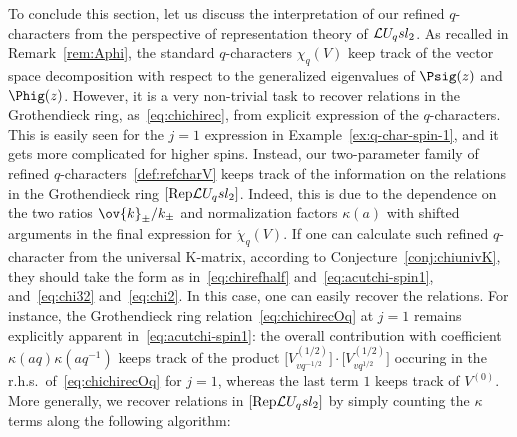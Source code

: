 \documentclass[11pt]{amsart}
\numberwithin{equation}{section}
\numberwithin{equation}{section}
\begin{document}
To conclude this section, let us discuss the interpretation of our refined $q$-characters from the perspective of representation theory of $\mathcal{L} U_q sl_2$.
As recalled in Remark~\ref{rem:Aphi},  the standard $q$-characters $\chi_q(V)$ keep track of the vector space decomposition with respect to the generalized eigenvalues of $\Psig(z)$ and $\Phig(z)$. 
However, it is a very non-trivial task to recover relations in the Grothendieck ring, as~\eqref{eq:chichirec}, from explicit expression of the $q$-characters.
This is easily seen for the $j=1$ expression  in Example~\ref{ex:q-char-spin-1}, and it gets more complicated for higher spins. 
  Instead, our two-parameter family of refined $q$-characters~\eqref{def:refcharV} keeps track of the information on the relations  in the Grothendieck ring $[\mathrm{Rep}\mathcal{L} U_q sl_2]$.
   Indeed, this is due to the dependence on 
   the two ratios $\ov{k}_\pm/k_\pm$ and  normalization factors $\kappa(a)$ with shifted arguments in the final expression for $\acute\chi_q(V)$. 
  If one can calculate such refined $q$-character from the universal K-matrix, according to Conjecture~\ref{conj:chiunivK}, they should take the form as in~\eqref{eq:chirefhalf} and~\eqref{eq:acutchi-spin1}, and~\eqref{eq:chi32} and~\eqref{eq:chi2}.
  In this case, one can easily recover the relations.
  For instance, the Grothendieck ring relation~\eqref{eq:chichirecOq} at $j=1$ remains explicitly apparent in~\eqref{eq:acutchi-spin1}: the overall contribution with coefficient $\kappa(aq)\kappa(aq^{-1})$ keeps track of the  product $\bigl[V_{vq^{-1/2}}^{(1/2)}\bigr]\cdot \bigl[V_{vq^{1/2}}^{(1/2)}\bigr]$ occuring in the r.h.s.\ of~\eqref{eq:chichirecOq} for $j=1$, whereas the last term $1$ keeps track of $V^{(0)}$. More generally, we recover relations in $[\mathrm{Rep}\mathcal{L} U_q sl_2]$ by simply counting the $\kappa$ terms along the following algorithm: 
\end{document}
